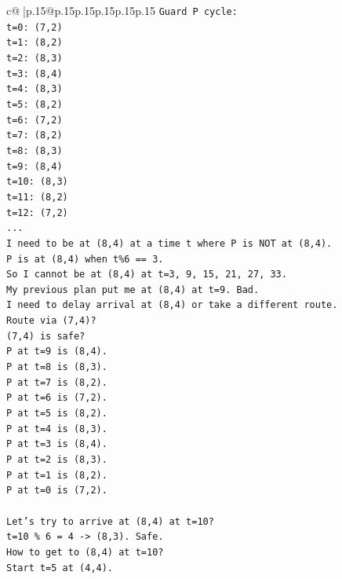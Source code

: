 \documentclass{article}
\begin{document}
{\begin{supertabular}{c@{$\;$}|p{.15\linewidth}@{}p{.15\linewidth}p{.15\linewidth}p{.15\linewidth}p{.15\linewidth}p{.15\linewidth}}
{{{\texttt{Guard P cycle:} \\
\texttt{t=0: (7,2)} \\
\texttt{t=1: (8,2)} \\
\texttt{t=2: (8,3)} \\
\texttt{t=3: (8,4)} \\
\texttt{t=4: (8,3)} \\
\texttt{t=5: (8,2)} \\
\texttt{t=6: (7,2)} \\
\texttt{t=7: (8,2)} \\
\texttt{t=8: (8,3)} \\
\texttt{t=9: (8,4)} \\
\texttt{t=10: (8,3)} \\
\texttt{t=11: (8,2)} \\
\texttt{t=12: (7,2)} \\
\texttt{...} \\
\texttt{I need to be at (8,4) at a time t where P is NOT at (8,4).} \\
\texttt{P is at (8,4) when t\%6 == 3.} \\
\texttt{So I cannot be at (8,4) at t=3, 9, 15, 21, 27, 33.} \\
\texttt{My previous plan put me at (8,4) at t=9. Bad.} \\
\texttt{I need to delay arrival at (8,4) or take a different route.} \\
\texttt{Route via (7,4)?} \\
\texttt{(7,4) is safe?} \\
\texttt{P at t=9 is (8,4).} \\
\texttt{P at t=8 is (8,3).} \\
\texttt{P at t=7 is (8,2).} \\
\texttt{P at t=6 is (7,2).} \\
\texttt{P at t=5 is (8,2).} \\
\texttt{P at t=4 is (8,3).} \\
\texttt{P at t=3 is (8,4).} \\
\texttt{P at t=2 is (8,3).} \\
\texttt{P at t=1 is (8,2).} \\
\texttt{P at t=0 is (7,2).} \\
\\ 
\texttt{Let's try to arrive at (8,4) at t=10?} \\
\texttt{t=10 \% 6 = 4 {-}> (8,3). Safe.} \\
\texttt{How to get to (8,4) at t=10?} \\
\texttt{Start t=5 at (4,4).} \\
}}}
\end{supertabular}}
\end{document}
